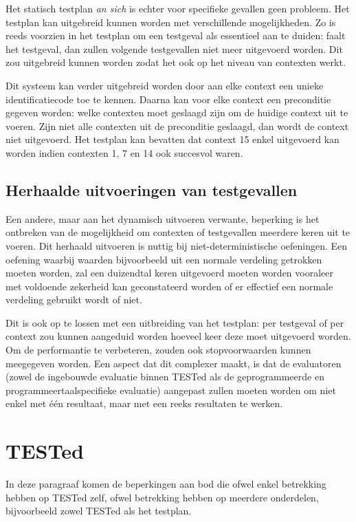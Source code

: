 Het statisch testplan \emph{an sich} is echter voor specifieke gevallen geen probleem.
Het testplan kan uitgebreid kunnen worden met verschillende mogelijkheden.
Zo is reeds voorzien in het testplan om een testgeval als essentieel aan te duiden: faalt het testgeval, dan zullen volgende testgevallen niet meer uitgevoerd worden.
Dit zou uitgebreid kunnen worden zodat het ook op het niveau van contexten werkt.

Dit systeem kan verder uitgebreid worden door aan elke context een unieke identificatiecode toe te kennen.
Daarna kan voor elke context een preconditie gegeven worden: welke contexten moet geslaagd zijn om de huidige context uit te voeren.
Zijn niet alle contexten uit de preconditie geslaagd, dan wordt de context niet uitgevoerd.
Het testplan kan bevatten dat context 15 enkel uitgevoerd kan worden indien contexten 1, 7 en 14 ook succesvol waren.

\subsection{Herhaalde uitvoeringen van testgevallen}\label{subsec:herhaalde-uitvoeringen-van-testgevallen}

Een andere, maar aan het dynamisch uitvoeren verwante, beperking is het ontbreken van de mogelijkheid om contexten of testgevallen meerdere keren uit te voeren.
Dit herhaald uitvoeren is nuttig bij niet-deterministische oefeningen.
Een oefening waarbij waarden bijvoorbeeld uit een normale verdeling getrokken moeten worden, zal een duizendtal keren uitgevoerd moeten worden vooraleer met voldoende zekerheid kan geconstateerd worden of er effectief een normale verdeling gebruikt wordt of niet.

Dit is ook op te lossen met een uitbreiding van het testplan: per testgeval of per context zou kunnen aangeduid worden hoeveel keer deze moet uitgevoerd worden.
Om de performantie te verbeteren, zouden ook stopvoorwaarden kunnen meegegeven worden.
Een aspect dat dit complexer maakt, is dat de evaluatoren (zowel de ingebouwde evaluatie binnen TESTed als de geprogrammeerde en programmeertaalspecifieke evaluatie) aangepast zullen moeten worden om niet enkel met één resultaat, maar met een reeks resultaten te werken.

\section{TESTed}\label{sec:beperkingen-tested}

In deze paragraaf komen de beperkingen aan bod die ofwel enkel betrekking hebben op TESTed zelf, ofwel betrekking hebben op meerdere onderdelen, bijvoorbeeld zowel TESTed als het testplan.

